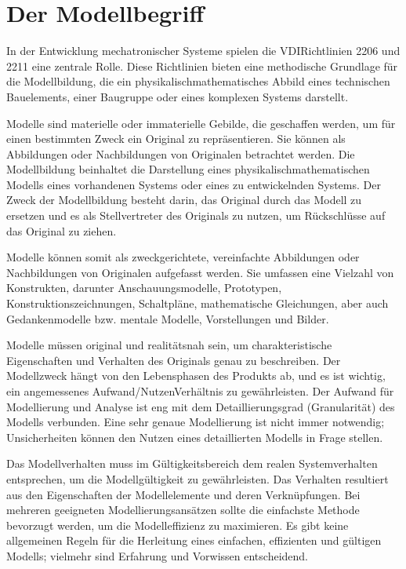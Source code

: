 \documentclass[letterpaper,10pt,german]{jupyterBook}
\begin{document}
\section{Der Modellbegriff}
\label{\detokenize{chapters/chapter1/Einf_xfchrung_Konstruktion:der-modellbegriff}}
\sphinxAtStartPar
In der Entwicklung mechatronischer Systeme spielen die VDI\sphinxhyphen{}Richtlinien 2206 und 2211 eine zentrale Rolle. Diese Richtlinien bieten eine methodische Grundlage für die Modellbildung, die ein physikalisch\sphinxhyphen{}mathematisches Abbild eines technischen Bauelements, einer Baugruppe oder eines komplexen Systems darstellt.

\sphinxAtStartPar
{}

\sphinxAtStartPar
Modelle sind materielle oder immaterielle Gebilde, die geschaffen werden, um für einen bestimmten Zweck ein Original zu repräsentieren. Sie können als Abbildungen oder Nachbildungen von Originalen betrachtet werden. Die Modellbildung beinhaltet die Darstellung eines physikalisch\sphinxhyphen{}mathematischen Modells eines vorhandenen Systems oder eines zu entwickelnden Systems. Der Zweck der Modellbildung besteht darin, das Original durch das Modell zu ersetzen und es als Stellvertreter des Originals zu nutzen, um Rückschlüsse auf das Original zu ziehen.

\sphinxAtStartPar
Modelle können somit als zweckgerichtete, vereinfachte Abbildungen oder Nachbildungen von Originalen aufgefasst werden. Sie umfassen eine Vielzahl von Konstrukten, darunter Anschauungsmodelle, Prototypen, Konstruktionszeichnungen, Schaltpläne, mathematische Gleichungen, aber auch Gedankenmodelle bzw. mentale Modelle, Vorstellungen und Bilder.

\sphinxAtStartPar
{}

\sphinxAtStartPar
Modelle müssen original\sphinxhyphen{} und realitätsnah sein, um charakteristische Eigenschaften und Verhalten des Originals genau zu beschreiben. Der Modellzweck hängt von den Lebensphasen des Produkts ab, und es ist wichtig, ein angemessenes Aufwand\sphinxhyphen{}/Nutzen\sphinxhyphen{}Verhältnis zu gewährleisten. Der Aufwand für Modellierung und Analyse ist eng mit dem Detaillierungsgrad (Granularität) des Modells verbunden. Eine sehr genaue Modellierung ist nicht immer notwendig; Unsicherheiten können den Nutzen eines detaillierten Modells in Frage stellen.

\sphinxAtStartPar
Das Modellverhalten muss im Gültigkeitsbereich dem realen Systemverhalten entsprechen, um die Modellgültigkeit zu gewährleisten. Das Verhalten resultiert aus den Eigenschaften der Modellelemente und deren Verknüpfungen. Bei mehreren geeigneten Modellierungsansätzen sollte die einfachste Methode bevorzugt werden, um die Modelleffizienz zu maximieren. Es gibt keine allgemeinen Regeln für die Herleitung eines einfachen, effizienten und gültigen Modells; vielmehr sind Erfahrung und Vorwissen entscheidend.
\end{document}
